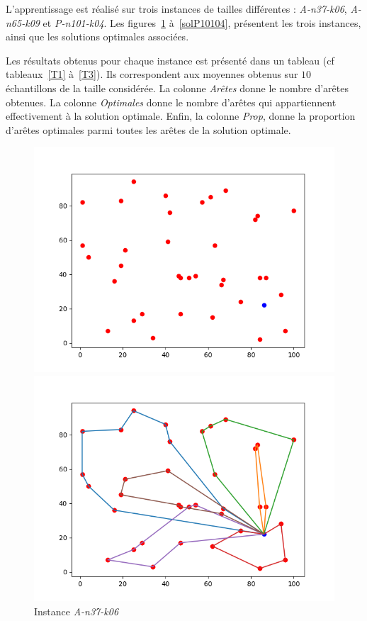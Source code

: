 \documentclass[a4paper,11pt]{article}%
\begin{document}
L'apprentissage est réalisé sur trois instances de tailles différentes : \emph{A-n37-k06}, \emph{A-n65-k09} et \emph{P-n101-k04}. Les figures~\ref{A3706} à~\ref{solP10104}, présentent les trois instances, ainsi que les solutions optimales associées. 

Les résultats obtenus pour chaque instance est présenté dans un tableau (cf tableaux~\ref{T1} à~\ref{T3}). Ils correspondent aux moyennes obtenus sur $10$ échantillons de la taille considérée.
La colonne \emph{Arêtes} donne le nombre d'arêtes obtenues. 
La colonne  \emph{Optimales} donne le nombre d'arêtes qui appartiennent effectivement à la solution optimale.
Enfin, la colonne \emph{Prop}, donne la proportion d'arêtes optimales parmi toutes les arêtes de la solution optimale. 

\begin{figure}[h!]
    \begin{minipage}[c]{.46\linewidth}

        \centering
        \includegraphics[scale=0.4]{instance3706}
        
        \caption{Instance \emph{A-n37-k06}}
        \label{A3706}

    \end{minipage}
    \hfill%
    \begin{minipage}[c]{.46\linewidth}
        \centering
        \includegraphics[scale=0.4]{best3706}
        

\end{minipage}
\end{figure}
\end{document}
